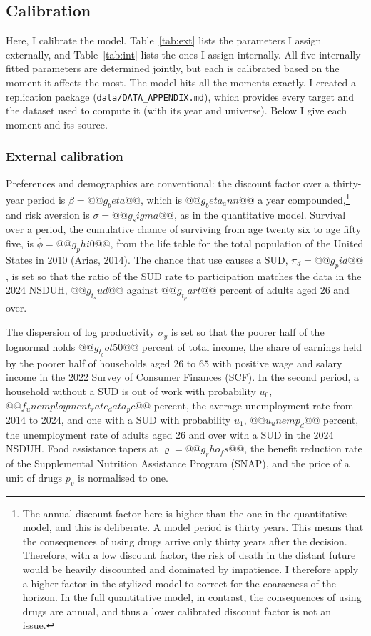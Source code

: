 \documentclass[10pt]{article}
\begin{document}
\subsection{Calibration}\label{sec:cal}

  Here, I calibrate the model. Table~\ref{tab:ext} lists the parameters I assign externally, and Table~\ref{tab:int} lists the ones I assign internally. All five internally fitted parameters are determined jointly, but each is calibrated based on the moment it affects the most. The model hits all the moments exactly. I created a replication package (\texttt{data/DATA\_APPENDIX.md}), which provides every target and the dataset used to compute it (with its year and universe). Below I give each moment and its source.

\subsubsection{External calibration}

Preferences and demographics are conventional: the discount factor over a
thirty-year period is $\beta=@@g_beta@@$, which is $@@g_beta_ann@@$ a year compounded,\footnote{The annual discount factor here is higher than the one in the
quantitative model, and this is deliberate.    A model period is thirty years. This means that the consequences of using drugs arrive only thirty years after the decision. Therefore, with a low discount factor, the risk of death in the distant future would be heavily discounted and dominated by impatience. I therefore apply a higher factor in the stylized model to correct for the coarseness of the horizon. In the full quantitative model, in contrast, the consequences of using drugs are annual, and thus a lower calibrated discount factor is not an issue.} and risk aversion is
$\sigma=@@g_sigma@@$, as in the quantitative model. Survival over a period, the cumulative chance of surviving from age twenty six to age fifty five, is
$\bar\phi = @@g_phi0@@$, from the life table for the total population of the United States in 2010
(Arias, 2014). The chance that use causes a SUD, $\pi_d=@@g_pid@@$, is set so that the ratio of the SUD rate to participation matches the data in the 2024 NSDUH, $@@g_t_sud@@$ against $@@g_t_part@@$ percent of adults aged 26 and over.

The dispersion of log productivity $\sigma_y$ is set so that the poorer half of the lognormal holds $@@g_t_bot50@@$ percent of total income, the share of earnings held by the poorer half of households aged $26$ to $65$ with positive wage and salary income in the 2022 Survey of Consumer Finances (SCF). In the second period, a household without a SUD is out of work with probability $u_0$, $@@f_unemployment_rate_data_pc@@$ percent, the average unemployment rate from 2014 to 2024, and one with a SUD with probability $u_1$, $@@u_unemp_d@@$ percent, the unemployment rate of adults aged 26 and over with a SUD in the 2024 NSDUH. Food assistance tapers at $\varrho=@@g_rho_fs@@$, the benefit reduction rate of the Supplemental Nutrition Assistance Program (SNAP), and the price of a unit of drugs $p_v$ is normalised to one.
\end{document}
